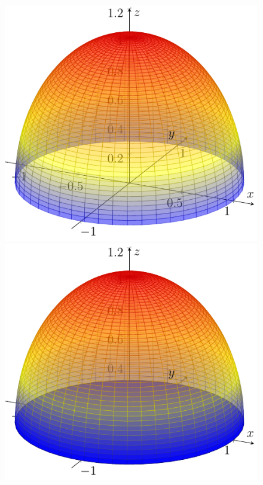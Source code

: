 \begin{frame}
    \begin{figure}[ht]
        \begin{minipage}[b]{0.30\linewidth}
            \centering
            \includegraphics[width=\textwidth]{../img/1-Topp.pdf}
        \end{minipage}
        \hspace{0.30cm}
        \begin{minipage}[b]{0.30\linewidth}
            \centering
            \includegraphics[width=\textwidth]{../img/3-Lukket.pdf}

\end{minipage}
\end{figure}
\end{frame}
